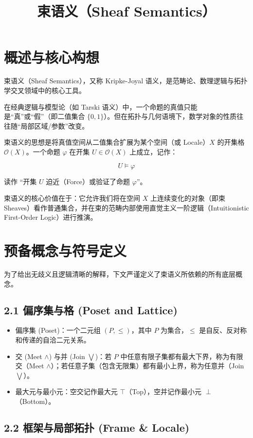 \documentclass[12pt,a4paper]{article}
\title{束语义（Sheaf Semantics）}
\author{}
\date{}
\begin{document}
\maketitle

\section{概述与核心构想}

束语义（Sheaf Semantics），又称 Kripke-Joyal 语义，是范畴论、数理逻辑与拓扑学交叉领域中的核心工具。

在经典逻辑与模型论（如 Tarski 语义）中，一个命题的真值只能是“真”或“假”（即二值集合 $\{0, 1\}$）。但在拓扑与几何语境下，数学对象的性质往往随“局部区域/参数”改变。

束语义的思想是将真值空间从二值集合扩展为某个空间（或 Locale）$X$ 的开集格 $\mathcal{O}(X)$。一个命题 $\varphi$ 在开集 $U \in \mathcal{O}(X)$ 上成立，记作：

\[
U \models \varphi
\]

读作 “开集 $U$ 迫近（Force）或验证了命题 $\varphi$”。

束语义的核心价值在于：它允许我们将在空间 $X$ 上连续变化的对象（即束 Sheaves）看作普通集合，并在束的范畴内部使用直觉主义一阶逻辑（Intuitionistic First-Order Logic）进行推演。

\section{预备概念与符号定义}

为了给出无歧义且逻辑清晰的解释，下文严谨定义了束语义所依赖的所有底层概念。

\subsection{2.1 偏序集与格 (Poset and Lattice)}

\begin{itemize}
  \item 偏序集 (Poset)：一个二元组 $(P, \le)$，其中 $P$ 为集合，$\le$ 是自反、反对称和传递的自洽二元关系。
  \item 交 (Meet $\wedge$) 与并 (Join $\bigvee$)：若 $P$ 中任意有限子集都有最大下界，称为有限交（Meet $\wedge$）；若任意子集（包含无限集）都有最小上界，称为任意并（Join $\bigvee$）。
  \item 最大元与最小元：空交记作最大元 $\top$（Top），空并记作最小元 $\perp$（Bottom）。
\end{itemize}

\subsection{2.2 框架与局部拓扑 (Frame \& Locale)}
\end{document}
